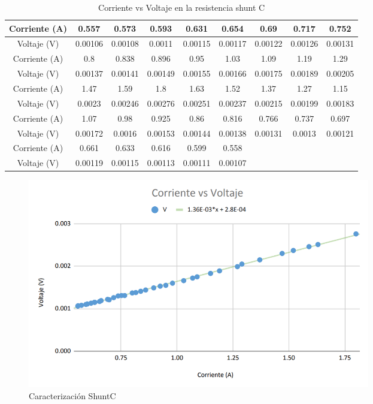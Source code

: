\begin{table} [H]
    \begin{center}
    \begin{tabular}{ |c|c|c|c|c|c|c|c|c| }
        \hline
        Corriente (A) & 0.557 & 0.573 & 0.593 & 0.631 & 0.654 & 0.69 & 0.717 & 0.752\\
        \hline
        Voltaje (V) & 0.00106 & 0.00108 & 0.0011 & 0.00115 & 0.00117 & 0.00122 & 0.00126 & 0.00131\\
        \hline
        \hline
        Corriente (A) & 0.8 & 0.838 & 0.896 & 0.95 & 1.03 & 1.09 & 1.19 & 1.29\\
        \hline
        Voltaje (V) & 0.00137 & 0.00141 & 0.00149 & 0.00155 & 0.00166 & 0.00175 & 0.00189 & 0.00205\\
        \hline
        \hline
        Corriente (A) & 1.47 & 1.59 & 1.8 & 1.63 & 1.52 & 1.37 & 1.27 & 1.15\\
        \hline
        Voltaje (V) & 0.0023 & 0.00246 & 0.00276 & 0.00251 & 0.00237 & 0.00215 & 0.00199 & 0.00183\\
        \hline
        \hline
        Corriente (A) & 1.07 & 0.98 & 0.925 & 0.86 & 0.816 & 0.766 & 0.737 & 0.697\\
        \hline
        Voltaje (V) & 0.00172 & 0.0016 & 0.00153 & 0.00144 & 0.00138 & 0.00131 & 0.0013 & 0.00121\\
        \hline
        \hline
        Corriente (A) & 0.661 & 0.633 & 0.616 & 0.599 & 0.558\\
        \hline
        Voltaje (V) & 0.00119 & 0.00115 & 0.00113 & 0.00111 & 0.00107\\
        \hline
    \end{tabular}
\end{center}
\caption{Corriente vs Voltaje en la resistencia shunt C}
\label{tab:shuntC}
\end{table}

\begin{figure}[H]
    \begin{center}
    \includegraphics[width = 15cm]{3Proyecto/CorrienteVoltaje3.png}
    \caption{ Caracterización ShuntC} 
    \label{fig:Muestras shuntC}
    \end{center}
\end{figure}


